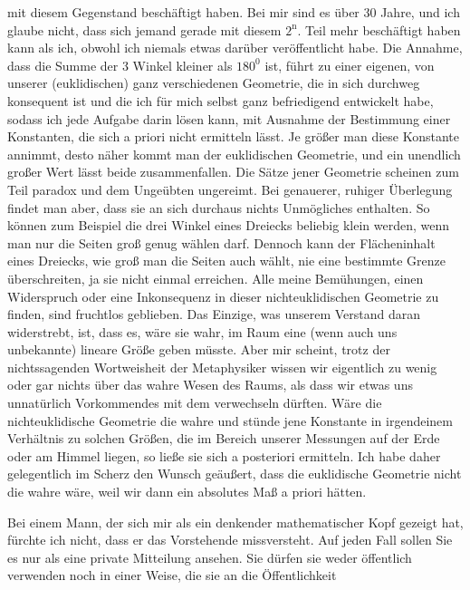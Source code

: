 mit diesem Gegenstand beschäftigt haben. Bei mir sind es über 30 Jahre, und ich glaube nicht,
dass sich jemand gerade mit diesem $2^{\mathrm n}.$ Teil mehr beschäftigt haben kann als ich,
obwohl ich niemals etwas darüber veröffentlicht habe. Die Annahme, dass die Summe der 3
Winkel kleiner als $180^{0}$ ist, führt zu einer eigenen, von unserer (euklidischen) ganz
verschiedenen Geometrie, die in sich durchweg konsequent ist und die ich für mich
selbst ganz befriedigend entwickelt habe, sodass ich jede Aufgabe darin lösen kann, mit
Ausnahme der Bestimmung einer Konstanten, die sich a priori nicht ermitteln lässt. Je größer
man diese Konstante annimmt, desto näher kommt man der euklidischen Geometrie, und ein
unendlich großer Wert lässt beide zusammenfallen. Die Sätze jener Geometrie scheinen zum
Teil paradox und dem Ungeübten ungereimt. Bei genauerer, ruhiger Überlegung findet man aber,
dass sie an sich durchaus nichts Unmögliches enthalten. So können zum Beispiel die drei Winkel eines
Dreiecks beliebig klein werden, wenn man nur die Seiten groß genug wählen darf.
Dennoch kann der Flächeninhalt eines Dreiecks, wie groß man die Seiten auch wählt, nie
eine bestimmte Grenze überschreiten, ja sie nicht einmal erreichen. Alle meine Bemühungen,
einen Widerspruch oder eine Inkonsequenz in dieser nichteuklidischen Geometrie zu finden, sind
fruchtlos geblieben. Das Einzige, was unserem Verstand daran widerstrebt, ist, dass es, wäre
sie wahr, im Raum eine  (wenn auch uns unbekannte) lineare Größe geben
müsste. Aber mir scheint, trotz der nichtssagenden Wortweisheit der Metaphysiker wissen wir
eigentlich zu wenig oder gar nichts über das wahre Wesen des Raums, als dass wir etwas uns
unnatürlich Vorkommendes mit dem  verwechseln dürften. Wäre die
nichteuklidische Geometrie die wahre und stünde jene Konstante in irgendeinem Verhältnis zu solchen
Größen, die im Bereich unserer Messungen auf der Erde oder am Himmel liegen, so ließe sie
sich a posteriori ermitteln. Ich habe daher gelegentlich im Scherz den Wunsch geäußert,
dass die euklidische Geometrie nicht die wahre wäre, weil wir dann ein absolutes Maß a priori
hätten.

Bei einem Mann, der sich mir als ein denkender mathematischer Kopf gezeigt hat, fürchte ich
nicht, dass er das Vorstehende missversteht. Auf jeden Fall sollen Sie es nur als
eine private Mitteilung ansehen. Sie dürfen sie weder öffentlich verwenden noch in einer Weise, die sie an die
Öffentlichkeit\space%
